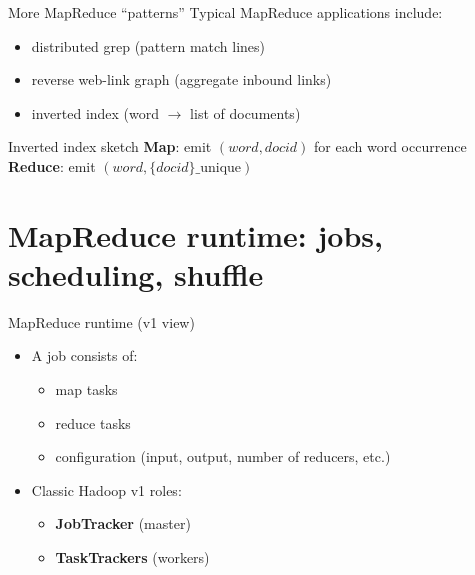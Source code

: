 \documentclass[10pt,aspectratio=169]{beamer}
\newenvironment{examplebox}[1][Example]{\begin{exampleblock}{#1}}{\end{exampleblock}}
\begin{document}
\begin{frame}{More MapReduce “patterns”}
Typical MapReduce applications include:
\begin{itemize}
  \item distributed grep (pattern match lines)
  \item reverse web-link graph (aggregate inbound links)
  \item inverted index (word $\rightarrow$ list of documents)
\end{itemize}
\begin{examplebox}[Inverted index sketch]
\textbf{Map}: emit \((word, docid)\) for each word occurrence\\
\textbf{Reduce}: emit \((word, \{docid\}\_{\text{unique}})\)
\end{examplebox}
\end{frame}

\section{MapReduce runtime: jobs, scheduling, shuffle}

\begin{frame}{MapReduce runtime (v1 view)}
\begin{itemize}
  \item A job consists of:
  \begin{itemize}
    \item map tasks
    \item reduce tasks
    \item configuration (input, output, number of reducers, etc.)
  \end{itemize}
  \item Classic Hadoop v1 roles:
  \begin{itemize}
    \item \textbf{JobTracker} (master)
    \item \textbf{TaskTrackers} (workers)
  \end{itemize}
\end{itemize}
\end{frame}
\end{document}

